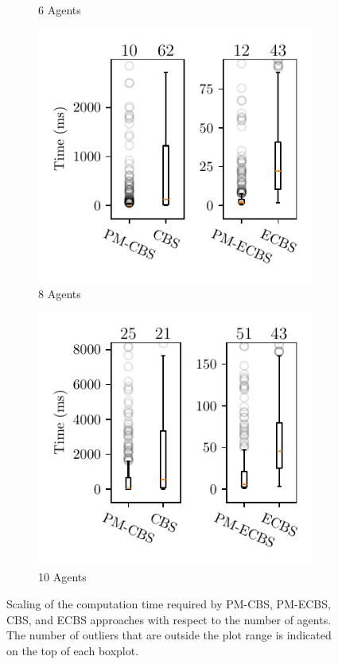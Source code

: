 \documentclass[letterpaper, 10 pt, conference]{ieeeconf}  %
\begin{document}
\begin{figure}[bt]
\begin{subfigure}[b]{.45\linewidth}
         \caption{6 Agents}
         \label{fig:timeR6}
     \end{subfigure}
     \begin{subfigure}[b]{.45\linewidth}
         \centering
         \includegraphics[width=\linewidth]{result/8_agents_time.pdf}
         \caption{8 Agents}
         \label{fig:timeR8}
     \end{subfigure}
     \begin{subfigure}[b]{.45\linewidth}
         \centering
         \includegraphics[width=\linewidth]{result/10_agents_time.pdf}
         \caption{10 Agents}
         \label{fig:timeR10}
     \end{subfigure}
    \caption{Scaling of the computation time required by PM-CBS, PM-ECBS, CBS, and ECBS approaches with respect to the number of agents. The number of outliers that are outside the plot range is indicated on the top of each boxplot.}
    \label{fig:timeR}
\end{figure}
\end{document}
